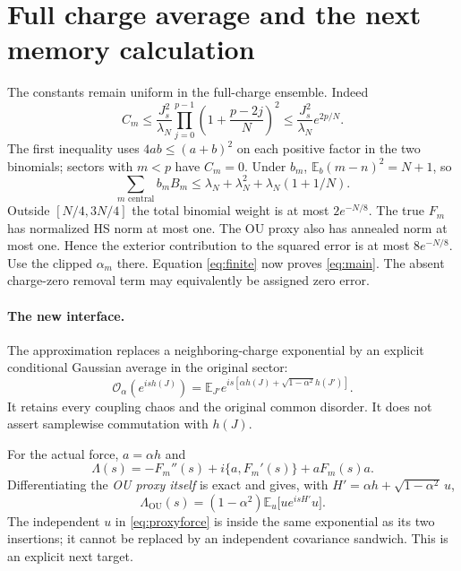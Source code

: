 \documentclass[11pt,a4paper]{article}
\newcommand{\EE}{\mathbb E}
\begin{document}
\newpage
\section{Full charge average and the next memory calculation}
The constants remain uniform in the full-charge ensemble. Indeed
\begin{equation}
 C_m\le\frac{J_s^2}{\lambda_N}
 \prod_{j=0}^{p-1}\left(1+\frac{p-2j}{N}\right)^2
 \le\frac{J_s^2}{\lambda_N}e^{2p/N}.
\end{equation}
The first inequality uses $4ab\le(a+b)^2$ on each positive factor
in the two binomials; sectors with $m<p$ have $C_m=0$.
Under $b_m$, $\EE_b(m-n)^2=N+1$, so
\begin{equation}
 \sum_{m\text{ central}}b_m B_m
 \le\lambda_N+\lambda_N^2+\lambda_N(1+1/N).
\end{equation}
Outside $[N/4,3N/4]$ the total binomial weight is at most
$2e^{-N/8}$. The true $F_m$ has normalized HS norm at most one.
The OU proxy also has annealed norm at most one. Hence the exterior
contribution to the squared error is at most $8e^{-N/8}$.
Use the clipped $\alpha_m$ there. Equation \eqref{eq:finite} now
proves \eqref{eq:main}. The absent charge-zero removal term may
equivalently be assigned zero error.

\paragraph{The new interface.}
The approximation replaces a neighboring-charge exponential by an
explicit conditional Gaussian average in the original sector:
\begin{equation}
 \mathcal O_\alpha(e^{ish(J)})
 =\EE_{J'}e^{is[\alpha h(J)+\sqrt{1-\alpha^2}h(J')]}.
\end{equation}
It retains every coupling chaos and the original common disorder.
It does not assert samplewise commutation with $h(J)$.

For the actual force, $a=\alpha h$ and
\begin{equation}
 \Lambda(s)=-F_m''(s)+i\{a,F_m'(s)\}+aF_m(s)a.
\end{equation}
Differentiating the \emph{OU proxy itself} is exact and gives,
with $H'=\alpha h+\sqrt{1-\alpha^2}\,u$,
\begin{equation}
 \Lambda_{\mathrm{OU}}(s)
 =(1-\alpha^2)\EE_u\big[u e^{isH'}u\big].
 \label{eq:proxyforce}
\end{equation}
The independent $u$ in \eqref{eq:proxyforce} is inside the same
exponential as its two insertions; it cannot be replaced by an
independent covariance sandwich. This is an explicit next target.
\end{document}
